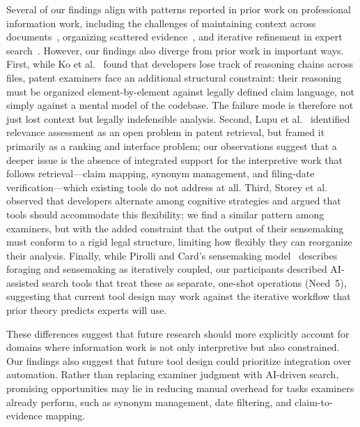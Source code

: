 \documentclass[sigconf]{acmart}
\begin{document}
Several of our findings align with patterns reported in prior work on
professional information work, including the challenges of maintaining context
across documents~\cite{Ko2006}, organizing scattered evidence~\cite{Russell1993},
and iterative refinement in expert search~\cite{Pirolli2005}. However, our
findings also diverge from prior work in important ways. First, while Ko
et al.~\cite{Ko2006} found that developers lose track of reasoning chains
across files, patent examiners face an additional structural constraint: their
reasoning must be organized element-by-element against legally defined claim
language, not simply against a mental model of the codebase. The failure mode
is therefore not just lost context but legally indefensible analysis. Second,
Lupu et al.~\cite{Lupu2013} identified relevance assessment as an open problem
in patent retrieval, but framed it primarily as a ranking and interface
problem; our observations suggest that a deeper issue is the absence of integrated
support for the interpretive work that follows retrieval---claim mapping,
synonym management, and filing-date verification---which existing tools do not
address at all. Third, Storey et al.~\cite{Storey1999} observed that developers
alternate among cognitive strategies and argued that tools should accommodate
this flexibility; we find a similar pattern among examiners, but with the
added constraint that the output of their sensemaking must conform to a rigid
legal structure, limiting how flexibly they can reorganize their analysis.
Finally, while Pirolli and Card's sensemaking model~\cite{Pirolli2005}
describes foraging and sensemaking as iteratively coupled, our participants
described AI-assisted search tools that treat these as separate, one-shot
operations (Need~5), suggesting that current tool design may work
against the iterative workflow that prior theory predicts experts will use.

These differences suggest that future research should more explicitly account
for domains where information work is not only interpretive but also
constrained. Our findings also suggest that future tool design could
prioritize integration over automation. Rather than replacing examiner
judgment with AI-driven search, promising opportunities may lie in
reducing manual overhead for tasks examiners already perform, such as synonym
management, date filtering, and claim-to-evidence mapping.


\end{document}
